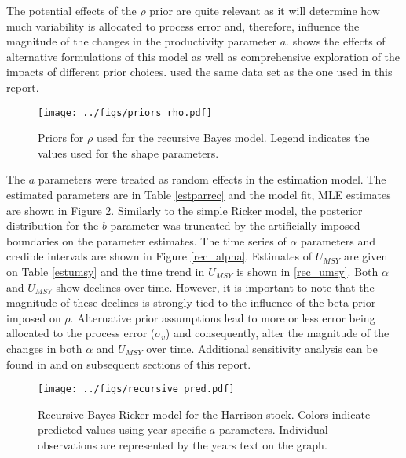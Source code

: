 \documentclass{article}
\begin{document}
The potential effects of the $\rho$ prior are quite relevant as it will determine how much variability is allocated to process error and, therefore, influence the magnitude of the changes in the productivity parameter $a$. \citet{davis_prior_2018} shows the effects of alternative formulations of this model as well as comprehensive exploration of the impacts of different prior choices.  \citet{davis_prior_2018} used the same data set as the one used in this report.   


\begin{figure}[ht]
  \centering
  \texttt{[image: ../figs/priors\_rho.pdf]}
  \caption{Priors for $\rho$ used for the recursive Bayes model. Legend indicates the values used for the shape parameters.}
\label{priorrho}
\end{figure}



The $a$ parameters were treated as random effects in the estimation model. The estimated parameters are in Table \ref{estparrec} and the model fit, MLE estimates are shown in Figure \ref{rec_fit}. Similarly to the simple Ricker model, the posterior distribution for the $b$ parameter was truncated by the artificially imposed boundaries on the parameter estimates. The time series of $\alpha$ parameters and credible intervals are shown in Figure \ref{rec_alpha}.  Estimates of $U_{MSY}$ are given on Table \ref{estumsy} and the time trend in $U_{MSY}$ is shown in \ref{rec_umsy}. Both $\alpha$ and $U_{MSY}$ show declines over time. However, it is important to note that the magnitude of these declines is strongly tied to the influence of the beta prior imposed on $\rho$. Alternative prior assumptions lead to more or less error being allocated to the process error ($\sigma_v$) and consequently, alter the magnitude of the changes in both $\alpha$ and $U_{MSY}$ over time. Additional sensitivity analysis can be found in \citet{davis_prior_2018} and on subsequent sections of this report.  











\begin{figure}[ht]
  \centering
  \texttt{[image: ../figs/recursive\_pred.pdf]}
  \caption{Recursive Bayes Ricker model for the Harrison stock. Colors indicate predicted values using year-specific $a$ parameters. Individual observations are represented by the years text on the graph.}
\label{rec_fit}
\end{figure}
\end{document}
